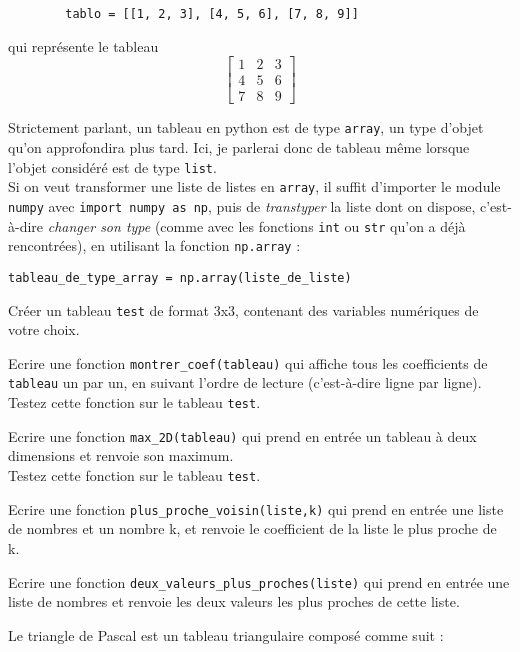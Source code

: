 	\begin{verbatim}
        tablo = [[1, 2, 3], [4, 5, 6], [7, 8, 9]]
    \end{verbatim}

	qui représente le tableau \[
		\begin{bmatrix}
			1 & 2 & 3 \\
			4 & 5 & 6 \\
			7 & 8 & 9
		\end{bmatrix}
	\]


	Strictement parlant, un tableau en python est de type \texttt{array}, un type d'objet qu'on approfondira plus tard. Ici, je parlerai donc de tableau même lorsque l'objet considéré est de type \texttt{list}. \\
	Si on veut transformer une liste de listes en \texttt{array}, il suffit d'importer le module \texttt{numpy} avec \texttt{import numpy as np}, puis de \textit{transtyper} la liste dont on dispose, c'est-à-dire \textit{changer son type} (comme avec les fonctions \texttt{int} ou \texttt{str} qu'on a déjà rencontrées), en utilisant la fonction \texttt{np.array} :

	\texttt{tableau\_de\_type\_array = np.array(liste\_de\_liste)}

\ssques Créer un tableau \texttt{test} de format 3x3, contenant des variables numériques de votre choix.

\ssques Ecrire une fonction \texttt{montrer\_coef(tableau)} qui affiche tous les coefficients de \texttt{tableau} un par un, en suivant l'ordre de lecture (c'est-à-dire ligne par ligne). \\
Testez cette fonction sur le tableau \texttt{test}.

\ssques Ecrire une fonction \texttt{max\_2D(tableau)} qui prend en entrée un tableau à deux dimensions et renvoie son maximum. \\
Testez cette fonction sur le tableau \texttt{test}.

\quessques Ecrire une fonction \texttt{plus\_proche\_voisin(liste,k)} qui prend en entrée une liste de nombres et un nombre k, et renvoie le coefficient de la liste le plus proche de k.

\ssques Ecrire une fonction \texttt{deux\_valeurs\_plus\_proches(liste)} qui prend en entrée une liste de nombres et renvoie les deux valeurs les plus proches de cette liste.


\exo

Le triangle de Pascal est un tableau triangulaire composé comme suit :

